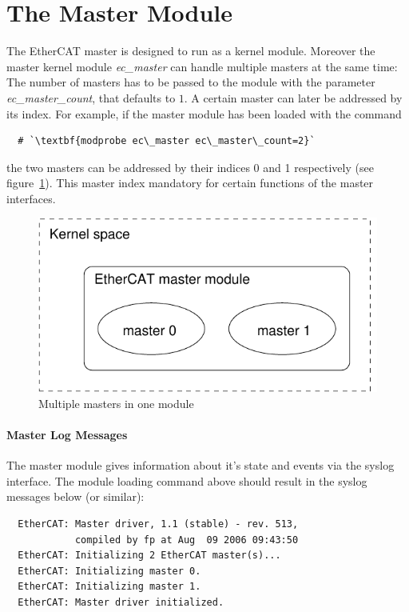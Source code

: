 \documentclass[a4paper,12pt,BCOR6mm,bibtotoc,idxtotoc]{scrbook}
\begin{document}

\section{The Master Module}
\label{sec:mastermod}

The EtherCAT master is designed to run as a kernel module. Moreover
the master kernel module \textit{ec\_master} can handle multiple
masters at the same time: The number of masters has to be passed to
the module with the parameter \textit{ec\_master\_count}, that
defaults to $1$. A certain master can later be addressed by its index.
For example, if the master module has been loaded with the command

\begin{lstlisting}
  # `\textbf{modprobe ec\_master ec\_master\_count=2}`
\end{lstlisting}

the two masters can be addressed by their indices 0 and 1 respectively
(see figure~\ref{fig:masters}). This master index mandatory for
certain functions of the master interfaces.

\begin{figure}[htbp]
  \centering
  \includegraphics[width=.5\textwidth]{images/masters}
  \caption{Multiple masters in one module}
  \label{fig:masters}
\end{figure}

\paragraph{Master Log Messages}

The master module gives information about it's state and events via
the syslog interface. The module loading command above should result
in the syslog messages below (or similar):

\begin{lstlisting}
  EtherCAT: Master driver, 1.1 (stable) - rev. 513,
            compiled by fp at Aug  09 2006 09:43:50
  EtherCAT: Initializing 2 EtherCAT master(s)...
  EtherCAT: Initializing master 0.
  EtherCAT: Initializing master 1.
  EtherCAT: Master driver initialized.
\end{lstlisting}
\end{document}
